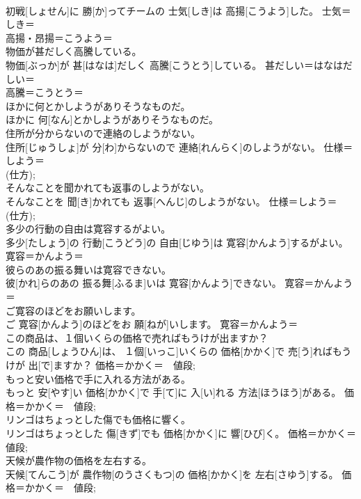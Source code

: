 \documentclass[8pt]{extreport}
\begin{document}
\begin{CJK}{UTF8}{min}
\\	初戦[しょせん]に 勝[か]ってチームの 士気[しき]は 高揚[こうよう]した。	士気＝しき＝ 
\\	高揚・昂揚＝こうよう＝ 
\\	物価が甚だしく高騰している。	
\\	物価[ぶっか]が 甚[はなは]だしく 高騰[こうとう]している。	甚だしい＝はなはだしい＝ 
\\	高騰＝こうとう＝ 
\\	ほかに何とかしようがありそうなものだ。	
\\	ほかに 何[なん]とかしようがありそうなものだ。	
\\	住所が分からないので連絡のしようがない。	
\\	住所[じゅうしょ]が 分[わ]からないので 連絡[れんらく]のしようがない。	仕様＝しよう＝ 
\\	(仕方); 
\\	そんなことを聞かれても返事のしようがない。	
\\	そんなことを 聞[き]かれても 返事[へんじ]のしようがない。	仕様＝しよう＝ 
\\	(仕方); 
\\	多少の行動の自由は寛容するがよい。	
\\	多少[たしょう]の 行動[こうどう]の 自由[じゆう]は 寛容[かんよう]するがよい。	寛容＝かんよう＝ 
\\	彼らのあの振る舞いは寛容できない。	
\\	彼[かれ]らのあの 振る舞[ふるま]いは 寛容[かんよう]できない。	寛容＝かんよう＝ 
\\	ご寛容のほどをお願いします。	
\\	ご 寛容[かんよう]のほどをお 願[ねが]いします。	寛容＝かんよう＝ 
\\	この商品は、１個いくらの価格で売ればもうけが出ますか？	
\\	この 商品[しょうひん]は、 １個[いっこ]いくらの 価格[かかく]で 売[う]ればもうけが 出[で]ますか？	価格＝かかく＝　値段; 
\\	もっと安い価格で手に入れる方法がある。	
\\	もっと 安[やす]い 価格[かかく]で 手[て]に 入[い]れる 方法[ほうほう]がある。	価格＝かかく＝　値段; 
\\	リンゴはちょっとした傷でも価格に響く。	
\\	リンゴはちょっとした 傷[きず]でも 価格[かかく]に 響[ひび]く。	価格＝かかく＝　値段; 
\\	天候が農作物の価格を左右する。	
\\	天候[てんこう]が 農作物[のうさくもつ]の 価格[かかく]を 左右[さゆう]する。	価格＝かかく＝　値段; 

\end{CJK}
\end{document}
